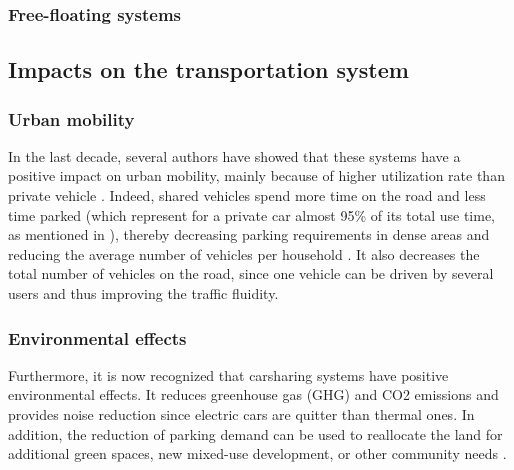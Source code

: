 \begin{bibunit}[ieeetr]
\subsubsection{Free-floating systems}



\subsection{Impacts on the transportation system}
\subsubsection{Urban mobility}

In the last decade, several authors have showed that these systems have a positive impact on urban mobility, mainly because of higher utilization rate than private vehicle \cite{litman_evaluating_2000, schuster_assessing_2005}.
Indeed, shared vehicles spend more time on the road and less time parked (which represent for a private car almost 95\% of its total use time, as mentioned in \cite{transflash_2013}), thereby decreasing parking requirements in dense areas \cite{mitchell_reinventing_2010} and reducing the average number of vehicles per household \cite{martin_impact_2010, ter_schure_cumulative_2012}.
It also decreases the total number of vehicles on the road, since one vehicle can be driven by several users and thus improving the traffic fluidity.

\subsubsection{Environmental effects}
Furthermore, it is now recognized that carsharing systems have positive environmental effects.
It reduces greenhouse gas (GHG) and CO2 emissions \cite{martin_greenhouse_2011, firnkorn_what_2011} and provides noise reduction since electric cars are quitter than thermal ones.
In addition, the reduction of parking demand can be used to reallocate the land for additional green spaces, new mixed-use development, or other community needs \cite{cohen_carsharing_2008}.





\end{bibunit}
